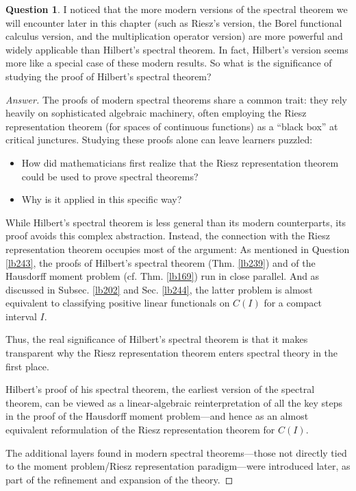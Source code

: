 \documentclass[12pt,b5paper,notitlepage]{article}
\theoremstyle{definition}
\newtheorem{question}[df]{Question}
\theoremstyle{plain}
\numberwithin{equation}{section}
\begin{document}
\begin{question}\label{lb250}
I noticed that the more modern versions of the spectral theorem we will encounter later in this chapter (such as Riesz's version, the Borel functional calculus version, and the multiplication operator version) are more powerful and widely applicable than Hilbert's spectral theorem. In fact, Hilbert's version seems more like a special case of these modern results. So what is the significance of studying the proof of Hilbert's spectral theorem?
\end{question}


\begin{proof}[Answer]
The proofs of modern spectral theorems share a common trait: they rely heavily on sophisticated algebraic machinery, often employing the Riesz representation theorem (for spaces of continuous functions) as a ``black box'' at critical junctures. Studying these proofs alone can leave learners puzzled:
\begin{itemize}
\item How did mathematicians first realize that the Riesz representation theorem could be used to prove spectral theorems?
\item Why is it applied in this specific way?
\end{itemize}


While Hilbert's spectral theorem is less general than its modern counterparts, its proof avoids this complex abstraction. Instead, the connection with the Riesz representation theorem occupies most of the argument: As mentioned in Question \ref{lb243}, the proofs of Hilbert's spectral theorem (Thm. \ref{lb239}) and of the Hausdorff moment problem (cf. Thm. \ref{lb169}) run in close parallel. And as discussed in Subsec. \ref{lb202} and Sec. \ref{lb244}, the latter problem is almost equivalent to classifying positive linear functionals on $C(I)$ for a compact interval $I$.




Thus, the real significance of Hilbert's spectral theorem is that it makes transparent why the Riesz representation theorem enters spectral theory in the first place. 
\begin{tcolorbox}
Hilbert's proof of his spectral theorem, the earliest version of the spectral theorem, can be viewed as a linear-algebraic reinterpretation of all the key steps in the proof of the Hausdorff moment problem---and hence as an almost equivalent reformulation of the Riesz representation theorem for $C(I)$.
\end{tcolorbox}
\noindent The additional layers found in modern spectral theorems---those not directly tied to the moment problem/Riesz representation paradigm---were introduced later, as part of the refinement and expansion of the theory.
\end{proof}
\end{document}

